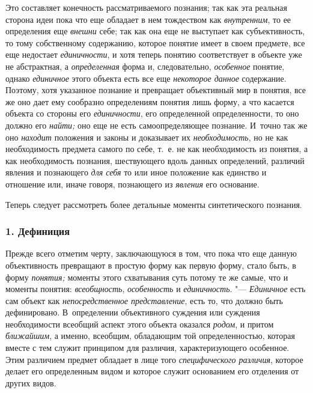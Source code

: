 Это составляет конечность рассматриваемого познания; так как
эта реальная сторона идеи пока что еще обладает в нем тождеством как
{\em внутренним}, то ее
определения еще {\em внешни}
себе; так как она еще не выступает как субъективность, то
тому собственному содержанию, которое понятие имеет в своем предмете, все
еще недостает {\em единичности},
и хотя теперь понятию соответствует в объекте уже не
абстрактная, а {\em определенная}
форма и, следовательно,
{\em особенное} понятие,
однако {\em единичное}
этого объекта есть все еще
{\em некоторое данное}
содержание. Поэтому, хотя указанное познание и превращает
объективный мир в понятия, все же оно дает ему сообразно
определениям понятия лишь форму, а что касается объекта со стороны его
{\em единичности}, его
определенной определенности, то оно должно его
{\em найти;} оно еще не
есть самоопределяющее познание. И~точно так же оно
{\em находит} положения и
законы и доказывает их
{\em необходимость}, но
не как необходимость предмета самого по себе, т.~е. не как необходимость из
понятия, а как необходимость познания, шествующего вдоль данных
определений, различий явления и познающего
{\em для себя} то или
иное положение как единство и отношение или, иначе говоря, познающего из
{\em явления} его
основание.

Теперь следует рассмотреть более детальные моменты
синтетического познания.
\subsubsection[1. Дефиниция]{\bfseries 1. Дефиниция}

Прежде всего отметим черту, заключающуюся в том, что пока что
еще данную объективность превращают в простую форму как первую форму, стало
быть, в форму {\em понятия;}
моменты этого схватывания суть потому те же самые, что и
моменты понятия: {\em всеобщность},
{\em особенность} и
{\em единичность}. "---
{\em Единичное} есть сам
объект как {\em непосредственное
представление}, есть то, что должно быть дефинировано.
В~определении объективного суждения или суждения необходимости всеобщий
аспект этого объекта оказался
{\em родом}, и притом
{\em ближайшим}, а
именно, всеобщим, обладающим той определенностью, которая вместе с тем
служит принципом для различия, характеризующего особенное. Этим различием
предмет обладает в лице того
{\em специфического различия},
которое делает его определенным видом и которое служит
основанием его отделения от других видов.

